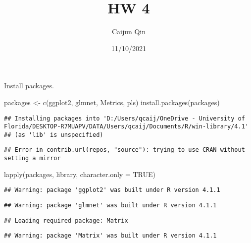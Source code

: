 \documentclass[
]{article}
\title{HW 4}
\author{Caijun Qin}
\date{11/10/2021}
\newenvironment{Shaded}{\begin{snugshade}}{\end{snugshade}}
\newcommand{\AttributeTok}[1]{\textcolor[rgb]{0.77,0.63,0.00}{#1}}
\newcommand{\ConstantTok}[1]{\textcolor[rgb]{0.00,0.00,0.00}{#1}}
\newcommand{\FunctionTok}[1]{\textcolor[rgb]{0.00,0.00,0.00}{#1}}
\newcommand{\NormalTok}[1]{#1}
\newcommand{\OtherTok}[1]{\textcolor[rgb]{0.56,0.35,0.01}{#1}}
\newcommand{\StringTok}[1]{\textcolor[rgb]{0.31,0.60,0.02}{#1}}
\begin{document}
\maketitle

Install packages.

\begin{Shaded}
\begin{Highlighting}[]
\NormalTok{packages }\OtherTok{\textless{}{-}} \FunctionTok{c}\NormalTok{(}\StringTok{\textquotesingle{}ggplot2\textquotesingle{}}\NormalTok{, }\StringTok{\textquotesingle{}glmnet\textquotesingle{}}\NormalTok{, }\StringTok{\textquotesingle{}Metrics\textquotesingle{}}\NormalTok{, }\StringTok{\textquotesingle{}pls\textquotesingle{}}\NormalTok{)}
\FunctionTok{install.packages}\NormalTok{(packages)}
\end{Highlighting}
\end{Shaded}

\begin{verbatim}
## Installing packages into 'D:/Users/qcaij/OneDrive - University of Florida/DESKTOP-R7MUAPV/DATA/Users/qcaij/Documents/R/win-library/4.1'
## (as 'lib' is unspecified)
\end{verbatim}

\begin{verbatim}
## Error in contrib.url(repos, "source"): trying to use CRAN without setting a mirror
\end{verbatim}

\begin{Shaded}
\begin{Highlighting}[]
\FunctionTok{lapply}\NormalTok{(packages, library, }\AttributeTok{character.only =} \ConstantTok{TRUE}\NormalTok{)}
\end{Highlighting}
\end{Shaded}

\begin{verbatim}
## Warning: package 'ggplot2' was built under R version 4.1.1
\end{verbatim}

\begin{verbatim}
## Warning: package 'glmnet' was built under R version 4.1.1
\end{verbatim}

\begin{verbatim}
## Loading required package: Matrix
\end{verbatim}

\begin{verbatim}
## Warning: package 'Matrix' was built under R version 4.1.1
\end{verbatim}
\end{document}

